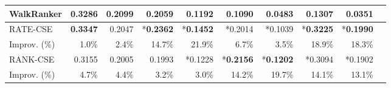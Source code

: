 \documentclass[sigconf,anonymous=false]{acmart}
\begin{document}
{\begin{table*}
{\begin{tabular}{lrrrrrrrrr}
    WalkRanker \cite{walkranker}& 0.3286    & {\bf 0.2099}   & 0.2059   & 0.1192   & 0.1090	& 0.0483    & 0.1307    & 0.0351        \\
\midrule
    RATE-CSE	                & {\bf 0.3347}    & 0.2047    & *{\bf 0.2362} & *{\bf 0.1452}   & *0.2014	& *0.1039   & *{\bf 0.3225}   & *{\bf 0.1990}      \\
    Improv. (\%)                & 1.0\%  & 2.4\%  & 14.7\%   & 21.9\%   & 6.7\%    & 3.5\%    & 18.9\%   & 18.3\%        \\
\midrule
    RANK-CSE	                & 0.3155    & 0.2005    & 0.1993    & *0.1228   & *{\bf 0.2156}   & *{\bf 0.1202}   & *0.3094   & *0.1902      \\
    Improv. (\%)                & 4.7\%  & 4.4\%  & 3.2\%  & 3.0\%  & 14.2\% & 19.7\% & 14.1\% & 13.1\%      \\
\end{tabular}
}


\end{table*}}
\end{document}
